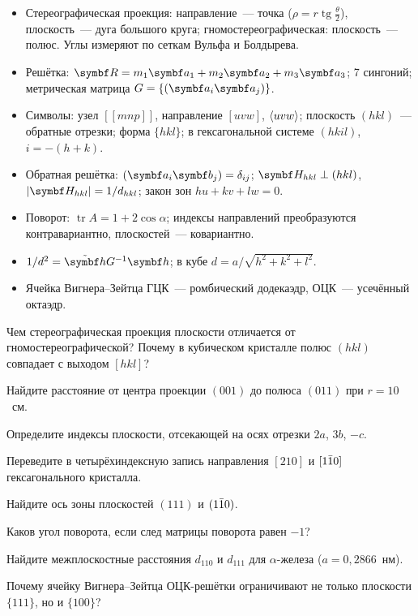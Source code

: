 \begin{itogi}
\begin{itemize}
\item Стереографическая проекция: направление~— точка ($\rho=r\operatorname{tg}\frac\theta2$),
плоскость~— дуга большого круга; гномостереографическая: плоскость~—
полюс. Углы измеряют по сеткам Вульфа и Болдырева.
\item Решётка: $\vb R=m_1\vb a_1+m_2\vb a_2+m_3\vb a_3$; 7 сингоний; метрическая
матрица $G=\{(\vb a_i\vb a_j)\}$.
\item Символы: узел $[\![mnp]\!]$, направление $[uvw]$, $\langle uvw\rangle$; плоскость
$(hkl)$~— обратные отрезки; форма $\{hkl\}$; в гексагональной системе
$(hkil)$, $i=-(h+k)$.
\item Обратная решётка: $(\vb a_i\vb b_j)=\delta_{ij}$; $\vb H_{hkl}\perp(hkl)$,
$|\vb H_{hkl}|=1/d_{hkl}$; закон зон $hu+kv+lw=0$.
\item Поворот: $\operatorname{tr}A=1+2\cos\alpha$; индексы направлений
преобразуются контравариантно, плоскостей~— ковариантно.
\item $1/d^2=\tilde{\vb h}G^{-1}\vb h$; в кубе $d=a/\sqrt{h^2+k^2+l^2}$.
\item Ячейка Вигнера--Зейтца ГЦК~— ромбический додекаэдр, ОЦК~— усечённый
октаэдр.
\end{itemize}
\end{itogi}

\begin{proverka}
\item Чем стереографическая проекция плоскости отличается от
гномостереографической? Почему в кубическом кристалле полюс $(hkl)$
совпадает с выходом $[hkl]$?
\item Найдите расстояние от центра проекции $(001)$ до полюса $(011)$ при
$r=10$~см.
\item Определите индексы плоскости, отсекающей на осях отрезки $2a$,
$3b$, $-c$.
\item Переведите в четырёхиндексную запись направления $[210]$ и $[1\bar{1}0]$
гексагонального кристалла.
\item Найдите ось зоны плоскостей $(111)$ и $(1\bar{1}0)$.
\item Каков угол поворота, если след матрицы поворота равен $-1$?
\item Найдите межплоскостные расстояния $d_{110}$ и $d_{111}$ для
$\alpha$-железа ($a=0{,}2866$~нм).
\item Почему ячейку Вигнера--Зейтца ОЦК-решётки ограничивают не только
плоскости $\{111\}$, но и $\{100\}$?
\end{proverka}
